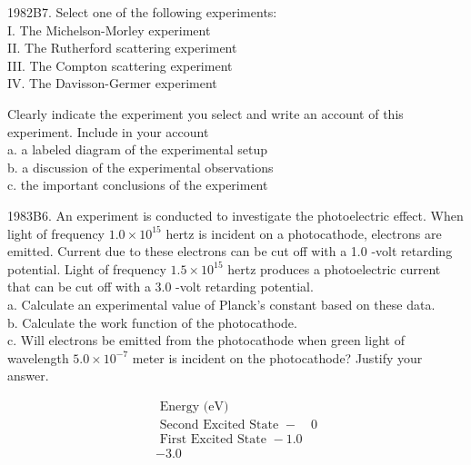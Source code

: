 \begin{enumerate}
1982B7. Select one of the following experiments:\\
I. The Michelson-Morley experiment\\
II. The Rutherford scattering experiment\\
III. The Compton scattering experiment\\
IV. The Davisson-Germer experiment

Clearly indicate the experiment you select and write an account of this experiment. Include in your account\\
a. a labeled diagram of the experimental setup\\
b. a discussion of the experimental observations\\
c. the important conclusions of the experiment

1983B6. An experiment is conducted to investigate the photoelectric effect. When light of frequency $1.0 \times 10^{15}$ hertz is incident on a photocathode, electrons are emitted. Current due to these electrons can be cut off with a 1.0 -volt retarding potential. Light of frequency $1.5 \times 10^{15}$ hertz produces a photoelectric current that can be cut off with a 3.0 -volt retarding potential.\\
a. Calculate an experimental value of Planck's constant based on these data.\\
b. Calculate the work function of the photocathode.\\
c. Will electrons be emitted from the photocathode when green light of wavelength $5.0 \times 10^{-7}$ meter is incident on the photocathode? Justify your answer.

$$
\begin{gathered}
\text { Energy (eV) } \\
\text { Second Excited State }-\quad 0 \\
\text { First Excited State }-1.0 \\
-3.0
\end{gathered}
$$


\end{enumerate}
